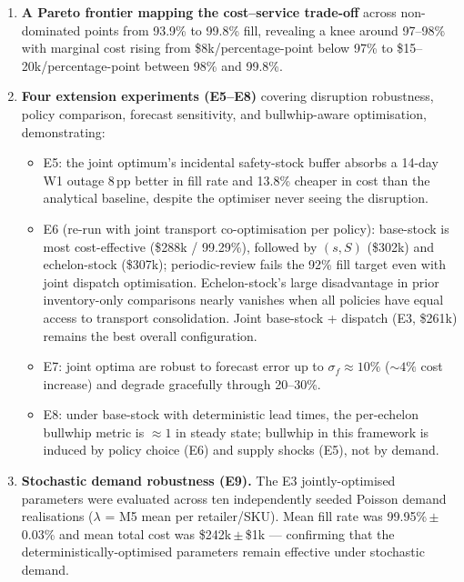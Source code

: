 \begin{enumerate}
  \item \textbf{A Pareto frontier mapping the cost--service trade-off}
        across non-dominated points from 93.9\% to 99.8\% fill,
        revealing a knee around 97--98\% with marginal cost rising from
        \$8k/percentage-point below 97\% to \$15--20k/percentage-point
        between 98\% and 99.8\%.

  \item \textbf{Four extension experiments (E5--E8)} covering
        disruption robustness, policy comparison, forecast
        sensitivity, and bullwhip-aware optimisation, demonstrating:
        \begin{itemize}
          \item E5: the joint optimum's incidental safety-stock buffer
                absorbs a 14-day W1 outage 8\,pp better in fill rate
                and 13.8\% cheaper in cost than the analytical
                baseline, despite the optimiser never seeing the
                disruption.
          \item E6 (re-run with joint transport co-optimisation per
                policy): base-stock is most cost-effective (\$288k /
                99.29\%), followed by $(s,S)$ (\$302k) and
                echelon-stock (\$307k); periodic-review fails the 92\%
                fill target even with joint dispatch optimisation.
                Echelon-stock's large disadvantage in prior
                inventory-only comparisons nearly vanishes when
                all policies have equal access to transport
                consolidation.  Joint base-stock + dispatch (E3,
                \$261k) remains the best overall configuration.
          \item E7: joint optima are robust to forecast error up to
                $\sigma_f \approx 10\%$ ($\sim 4\%$ cost increase) and
                degrade gracefully through 20--30\%.
          \item E8: under base-stock with deterministic lead times,
                the per-echelon bullwhip metric is $\approx 1$ in
                steady state; bullwhip in this framework is induced
                by policy choice (E6) and supply shocks (E5), not by
                demand.
        \end{itemize}

  \item \textbf{Stochastic demand robustness (E9).}  The E3 jointly-optimised
        parameters were evaluated across ten independently seeded Poisson
        demand realisations ($\lambda$ = M5 mean per retailer/SKU).
        Mean fill rate was 99.95\%\,$\pm$\,0.03\% and mean total cost
        was \$242k\,$\pm$\,\$1k — confirming that the deterministically-optimised
        parameters remain effective under stochastic demand.


\end{enumerate}
